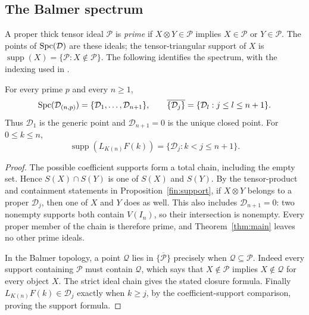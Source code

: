 \subsection{The Balmer spectrum}

A proper thick tensor ideal $\mathcal P$ is \emph{prime} if
$X\otimes Y\in\mathcal P$ implies $X\in\mathcal P$ or
$Y\in\mathcal P$.  The points of $\operatorname{Spc}(\mathcal D)$ are these ideals;
the tensor-triangular support of $X$ is
$\operatorname{supp}(X)=\{\mathcal P:X\notin\mathcal P\}$.
The following identifies the spectrum, with the indexing used in
\cite[Proposition~3.5]{BHN22}.

\begin{corollary}\label{fin:balmer}
For every prime $p$ and every $n\geq1$,
\[
 \operatorname{Spc}(\mathcal D_{(n,p)})
      =\{\mathcal D_1,\ldots,\mathcal D_{n+1}\},\qquad
 \overline{\{\mathcal D_j\}}
      =\{\mathcal D_l:j\leq l\leq n+1\}.
\]
Thus $\mathcal D_1$ is the generic point and
$\mathcal D_{n+1}=0$ is the unique closed point.  For $0\leq k\leq n$,
\[
 \operatorname{supp}(L_{K(n)}F(k))
      =\{\mathcal D_j:k<j\leq n+1\}.
\]
\end{corollary}

\begin{proof}
The possible coefficient supports form a total chain, including the
empty set.  Hence $S(X)\cap S(Y)$ is one of $S(X)$ and $S(Y)$.
By the tensor-product and containment statements in
Proposition~\ref{fin:support}, if $X\otimes Y$ belongs to a proper
$\mathcal D_j$, then one of $X$ and $Y$ does as well.
This also includes $\mathcal D_{n+1}=0$: two nonempty supports both
contain $V(I_n)$, so their intersection is nonempty.
Every proper member of the chain is therefore prime, and
Theorem~\ref{thm:main} leaves no other prime ideals.

In the Balmer topology, a point $\mathcal Q$ lies in
$\overline{\{\mathcal P\}}$ precisely when
$\mathcal Q\subseteq\mathcal P$.
Indeed every support containing $\mathcal P$ must contain
$\mathcal Q$, which says that $X\notin\mathcal P$ implies
$X\notin\mathcal Q$ for every object $X$.
The strict ideal chain gives the stated closure formula.
Finally $L_{K(n)}F(k)\in\mathcal D_j$ exactly when $k\geq j$,
by the coefficient-support comparison, proving the support formula.
\end{proof}

